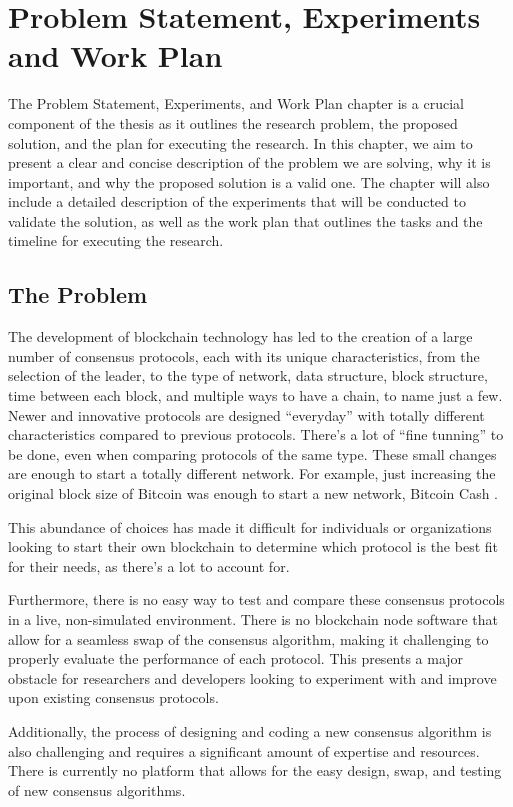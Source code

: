 \chapter{Problem Statement, Experiments and Work Plan}

The Problem Statement, Experiments, and Work Plan chapter is a crucial component of the thesis as it outlines the research problem, the proposed solution, and the plan for executing the research. In this chapter, we aim to present a clear and concise description of the problem we are solving, why it is important, and why the proposed solution is a valid one. The chapter will also include a detailed description of the experiments that will be conducted to validate the solution, as well as the work plan that outlines the tasks and the timeline for executing the research.

\section{The Problem}
The development of blockchain technology has led to the creation of a large number of consensus protocols, each with its unique characteristics, from the selection of the leader, to the type of network, data structure, block structure, time between each block, and multiple ways to have a chain, to name just a few. Newer and innovative protocols are designed ``everyday'' with totally different characteristics compared to previous protocols. There's a lot of ``fine tunning'' to be done, even when comparing protocols of the same type. These small changes are enough to start a totally different network. For example, just increasing the original block size of Bitcoin was enough to start a new network, Bitcoin Cash \cite{bitcoincash}.
\label{bitcoincashexample}

This abundance of choices has made it difficult for individuals or organizations looking to start their own blockchain to determine which protocol is the best fit for their needs, as there's a lot to account for.

Furthermore, there is no easy way to test and compare these consensus protocols in a live, non-simulated environment.
There is no blockchain node software that allow for a seamless swap of the consensus algorithm, making it challenging to properly evaluate the performance of each protocol. This presents a major obstacle for researchers and developers looking to experiment with and improve upon existing consensus protocols.

Additionally, the process of designing and coding a new consensus algorithm is also challenging and requires a significant amount of expertise and resources. There is currently no platform that allows for the easy design, swap, and testing of new consensus algorithms.

